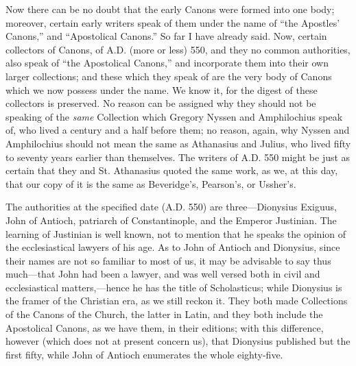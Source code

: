 Now there can be no doubt that the early Canons were formed into
one body; moreover, certain early writers speak of them under the name
of ``the Apostles' Canons,'' and ``Apostolical
Canons.'' So far I have already said. Now, certain collectors of
Canons, of A.D. (more or less) 550, and they no
common authorities, also speak of ``the Apostolical Canons,''
and incorporate them into their own larger collections; and these
which they speak of are the very body of Canons which we now possess
under the name. We know it, for the digest of these collectors is
preserved. No reason can be assigned why they should not be speaking
of the \emph{same} Collection which Gregory Nyssen and Amphilochius
speak of, who lived a century and a half before them; no reason,
again, why Nyssen and Amphilochius should not mean the same as
Athanasius and Julius, who lived fifty to seventy years earlier than
themselves. The writers of A.D. 550 might be
just as certain that they and St. Athanasius quoted the same
work, as we, at this day, that our copy of it is the same as Beveridge's,
Pearson's, or Ussher's.

The authorities at the specified date (A.D.
550) are three—Dionysius Exiguus, John of Antioch, patriarch of
Constantinople, and the Emperor Justinian. The learning of Justinian
is well known, not to mention that he speaks the opinion of the
ecclesiastical lawyers of his age. As to John of Antioch and Dionysius,
since their names are not so familiar to most of us, it may be
advisable to say thus much—that John had been a lawyer, and was well
versed both in civil and ecclesiastical matters,—hence he has the
title of Scholasticus; while Dionysius is the framer of the Christian
era, as we still reckon it. They both made Collections of the Canons
of the Church, the latter in Latin, and they both include the
Apostolical Canons, as we have them, in their editions; with this
difference, however (which does not at present concern us), that
Dionysius published but the first fifty, while John of Antioch
enumerates the whole eighty-five.

